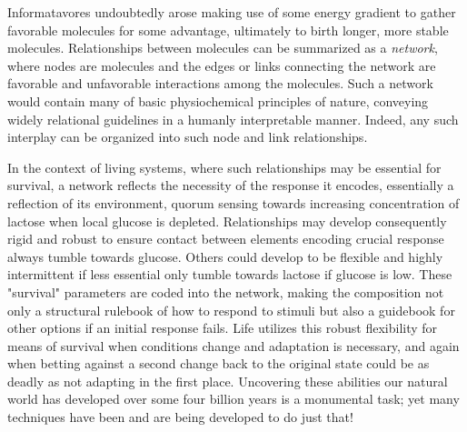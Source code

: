 Informatavores undoubtedly arose making use of some energy gradient to gather favorable molecules for some advantage, ultimately to birth longer, more stable molecules. Relationships between molecules can be summarized as a \emph{network}, where nodes are molecules and the edges or links connecting the network are favorable and unfavorable interactions among the molecules. Such a network would contain many of basic physiochemical principles of nature, conveying widely relational guidelines in a humanly interpretable manner. Indeed, any such interplay can be organized into such node and link relationships.

In the context of living systems, where such relationships may be essential for survival, a network reflects the necessity of the response it encodes, essentially a reflection of its environment, \eg \coli quorum sensing towards increasing concentration of lactose when local glucose is depleted. Relationships may develop consequently rigid and robust to ensure contact between elements encoding crucial response \eg always tumble towards glucose. Others could develop to be flexible and highly intermittent if less essential \eg only tumble towards lactose if glucose is low.
These "survival" parameters are coded into the network, making the composition not only a structural rulebook of how to respond to stimuli but also a guidebook for other options if an initial response fails. 
Life utilizes this robust flexibility for means of survival when conditions change and adaptation is necessary, and again when betting against a second change back to the original state could be as deadly as not adapting in the first place. Uncovering these abilities our natural world has developed over some four billion years is a monumental task; yet many techniques have been and are being developed to do just that!

